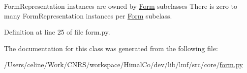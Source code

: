 Form\+Representation instances are owned by \hyperlink{classlmf_1_1src_1_1core_1_1form_1_1_form}{Form} subclasses There is zero to many Form\+Representation instances per \hyperlink{classlmf_1_1src_1_1core_1_1form_1_1_form}{Form} subclass. 



Definition at line 25 of file form.\+py.



The documentation for this class was generated from the following file\+:\begin{DoxyCompactItemize}
\item 
/\+Users/celine/\+Work/\+C\+N\+R\+S/workspace/\+Himal\+Co/dev/lib/lmf/src/core/\hyperlink{form_8py}{form.\+py}\end{DoxyCompactItemize}
